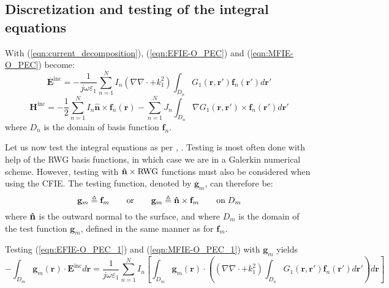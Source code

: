 \documentclass[a4paper,10pt]{book}
\newcommand{\field}[1]{\mathbf{#1}}
\newcommand{\current}[1]{\mathbf{#1}}
\newcommand{\vect}[1]{\mathbf{#1}}
\newcommand{\uvect}[1]{\ensuremath{\mathbf{\Hat{#1}}}}
\renewcommand{\arg}[1]{\ensuremath{\!\left(#1\right)}}
\begin{document}
\subsection{Discretization and testing of the integral equations}
%
\par
With (\ref{eqn:current_decomposition}), (\ref{eqn:EFIE-O_PEC}) and (\ref{eqn:MFIE-O_PEC}) become:
\begin{equation}\label{eqn:EFIE-O_PEC_1}
\field{E}^\text{inc} =  - \frac{1}{j \omega \varepsilon_1} \sum_{n=1}^{N} I_n \left(\nabla \nabla \cdot + k_1^2\right) \int_{D_n} G_1\left(\vect{r}, \vect{r}'\right) \current{f}_n\left(\vect{r}'\right) d\vect{r}'
\end{equation}
\begin{equation}\label{eqn:MFIE-O_PEC_1}
\field{H}^\text{inc} = - \frac{1}{2} \sum_{n=1}^{N} I_n \vect{\hat{n}} \times \current{f}_{n}\arg{\vect{r}} - \sum_{n=1}^{N} J_n \int_{D_n} \nabla G_1\left(\vect{r}, \vect{r}'\right) \times \current{f}_n\left(\vect{r}'\right) d\vect{r}'
\end{equation}
where $D_n$ is the domain of basis function $\vect{f}_n$.
%
\par
Let us now test the integral equations as per \cite{Har_68}, \cite{Rao_82}. Testing is most often done with help of the RWG basis functions, in which case we are in a Galerkin numerical scheme.  However, testing with $\uvect{n} \times \text{RWG}$ functions must also be considered when using the CFIE. The testing function, denoted by $\vect{g}_m$, can therefore be:
\begin{equation}
\vect{g}_m \triangleq \vect{f}_m \qquad \text{or} \qquad \vect{g}_m \triangleq \uvect{n} \times \vect{f}_m \qquad \text{on} \; D_m
\end{equation}
where $\uvect{n}$ is the outward normal to the surface, and where $D_m$ is the domain of the test function $\vect{g}_m$, defined in the same manner as for $\vect{f}_m$.
%
\par
Testing (\ref{eqn:EFIE-O_PEC_1}) and (\ref{eqn:MFIE-O_PEC_1}) with $\vect{g}_m$ yields
\begin{equation}\label{eqn:EFIE-O_PEC_2}
\boxed{-\int_{D_m}\vect{g}_m \arg{\vect{r}} \cdot \field{E}^\text{inc} d\vect{r} =  \frac{1}{j \omega \varepsilon_1} \sum_{n=1}^{N} I_n \left[\int_{D_m}\vect{g}_m \arg{\vect{r}} \cdot \left( \left(\nabla \nabla \cdot + k_1^2\right) \int_{D_n} G_1\left(\vect{r}, \vect{r}'\right) \current{f}_n\left(\vect{r}'\right) d\vect{r}' \right) d\vect{r} \right]}
\end{equation}
\end{document}
